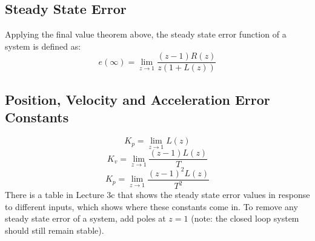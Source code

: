 \documentclass[journal]{IEEEtran}
\begin{document}
\subsection{\textbf{Steady State Error}}
Applying the final value theorem above, the steady state error function of a system is defined as:
\[
	e(\infty) = \lim_{z\to1} \frac{(z - 1)R(z)}{z(1 + L(z))}
\]
\subsection{\textbf{Position, Velocity and Acceleration Error Constants}}
\[
	K_p = \lim_{z\to1} L(z)
\]
\[
	K_v = \lim_{z\to1} \frac{(z - 1)L(z)}{T}
\]
\[
	K_p = \lim_{z\to1} \frac{(z - 1)^2L(z)}{T^2}
\]
There is a table in Lecture 3c that shows the steady state error values in response to different inputs, which shows where these constants come in. To remove any steady state error of a system, add poles at $z = 1$ (note: the closed loop system should still remain stable).
\end{document}
